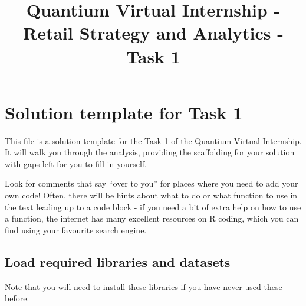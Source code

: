 \documentclass[
]{article}
\title{Quantium Virtual Internship - Retail Strategy and Analytics -
Task 1}
\author{}
\date{\vspace{-2.5em}}
\begin{document}
\maketitle

\hypertarget{solution-template-for-task-1}{%
\section{Solution template for Task
1}\label{solution-template-for-task-1}}

This file is a solution template for the Task 1 of the Quantium Virtual
Internship. It will walk you through the analysis, providing the
scaffolding for your solution with gaps left for you to fill in
yourself.

Look for comments that say ``over to you'' for places where you need to
add your own code! Often, there will be hints about what to do or what
function to use in the text leading up to a code block - if you need a
bit of extra help on how to use a function, the internet has many
excellent resources on R coding, which you can find using your favourite
search engine.

\hypertarget{load-required-libraries-and-datasets}{%
\subsection{Load required libraries and
datasets}\label{load-required-libraries-and-datasets}}

Note that you will need to install these libraries if you have never
used these before.
\end{document}

